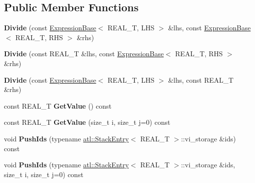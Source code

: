 \subsection*{Public Member Functions}
\begin{DoxyCompactItemize}
\item 
\hypertarget{structatl_1_1_divide_a6a73e9fdb3a745ac384b027797a51d64}{{\bfseries Divide} (const \hyperlink{structatl_1_1_expression_base}{Expression\+Base}$<$ R\+E\+A\+L\+\_\+\+T, L\+H\+S $>$ \&lhs, const \hyperlink{structatl_1_1_expression_base}{Expression\+Base}$<$ R\+E\+A\+L\+\_\+\+T, R\+H\+S $>$ \&rhs)}\label{structatl_1_1_divide_a6a73e9fdb3a745ac384b027797a51d64}

\item 
\hypertarget{structatl_1_1_divide_af1d32dc16af3a699e5bd5c386a4a9e7c}{{\bfseries Divide} (const R\+E\+A\+L\+\_\+\+T \&lhs, const \hyperlink{structatl_1_1_expression_base}{Expression\+Base}$<$ R\+E\+A\+L\+\_\+\+T, R\+H\+S $>$ \&rhs)}\label{structatl_1_1_divide_af1d32dc16af3a699e5bd5c386a4a9e7c}

\item 
\hypertarget{structatl_1_1_divide_ad9933af702709a62b3f4fb3fd238b0cb}{{\bfseries Divide} (const \hyperlink{structatl_1_1_expression_base}{Expression\+Base}$<$ R\+E\+A\+L\+\_\+\+T, L\+H\+S $>$ \&lhs, const R\+E\+A\+L\+\_\+\+T \&rhs)}\label{structatl_1_1_divide_ad9933af702709a62b3f4fb3fd238b0cb}

\item 
\hypertarget{structatl_1_1_divide_ae639697a3d873b9b027dc6ce6df195ad}{const R\+E\+A\+L\+\_\+\+T {\bfseries Get\+Value} () const }\label{structatl_1_1_divide_ae639697a3d873b9b027dc6ce6df195ad}

\item 
\hypertarget{structatl_1_1_divide_aee55c50583b536e4a6ef6e32b02d4054}{const R\+E\+A\+L\+\_\+\+T {\bfseries Get\+Value} (size\+\_\+t i, size\+\_\+t j=0) const }\label{structatl_1_1_divide_aee55c50583b536e4a6ef6e32b02d4054}

\item 
\hypertarget{structatl_1_1_divide_a1364bf196ce7e76665d8cb203786f3d8}{void {\bfseries Push\+Ids} (typename \hyperlink{structatl_1_1_stack_entry}{atl\+::\+Stack\+Entry}$<$ R\+E\+A\+L\+\_\+\+T $>$\+::vi\+\_\+storage \&ids) const }\label{structatl_1_1_divide_a1364bf196ce7e76665d8cb203786f3d8}

\item 
\hypertarget{structatl_1_1_divide_a43d0b1a7b9e721fac5388995d873b995}{void {\bfseries Push\+Ids} (typename \hyperlink{structatl_1_1_stack_entry}{atl\+::\+Stack\+Entry}$<$ R\+E\+A\+L\+\_\+\+T $>$\+::vi\+\_\+storage \&ids, size\+\_\+t i, size\+\_\+t j=0) const }\label{structatl_1_1_divide_a43d0b1a7b9e721fac5388995d873b995}


\end{DoxyCompactItemize}
